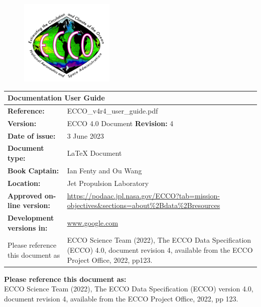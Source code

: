 \begin{figure}[t] %
  \centering %
  \includegraphics[width=0.4\textwidth]{../images/ecco_logo_800_726.png} %
\end{figure}

\maketitle
  
\begin{center}
  \begin{tabular}{|p{2in}|p{4in}|}
    \hline
      \multicolumn{2}{|l|}{\textbf{Documentation User Guide}} \\
    \hline
      \textbf{Reference:} & ECCO\_v4r4\_user\_guide.pdf \\
    \hline
      \textbf{Version:} & ECCO 4.0 Document \textbf{Revision:} 4 \\
    \hline
      \textbf{Date of issue:} & 3 June 2023 \\
    \hline
      \textbf{Document type:} & \LaTeX{} Document \\
    \hline
      \textbf{Book Captain:} & Ian Fenty and Ou Wang \\
    \hline
      \textbf{Location:} & Jet Propulsion Laboratory \\
    \hline
      \textbf{Approved on-line version:} & \url{https://podaac.jpl.nasa.gov/ECCO?tab=mission-objectives\&sections=about\%2Bdata\%2Bresources} \\
    \hline
      \textbf{Development versions in:} & \url{www.google.com} \\
    \hline
      Please reference this document as & ECCO Science Team (2022), The ECCO Data Specification (ECCO) 4.0, document revision 4, available from the ECCO  Project Office, 2022, pp123. \\
    \hline
  \end{tabular}
\end{center}
  
\textbf{Please reference this document as:}\\
  ECCO Science Team (2022), The ECCO Data Specification (ECCO) version 4.0,\\
  document revision 4, available from the ECCO Project Office, 2022, pp 123.
  
\newpage
\mbox{}